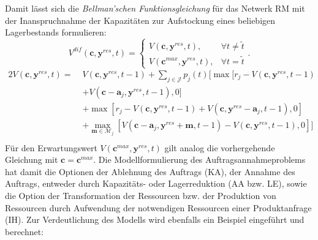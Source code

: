 Damit lässt sich die \textit{Bellman'schen Funktionsgleichung} für das Netwerk RM mit der Inanspruchnahme der Kapazitäten zur Aufstockung eines beliebigen Lagerbestands formulieren:
\begin{equation}\label{dif}
     V^{dif}(\textbf{c}, \textbf{y}^{res}, t)=\left\{\begin{array}{ll} V(\textbf{c}, \textbf{y}^{res}, t), & \forall t\neq\tilde{t}\\
         V(\textbf{c}^{max}, \textbf{y}^{res}, t), &\forall t=\tilde{t}\end{array}\right. .
\end{equation}
\begin{alignat*}{2}
 V(\textbf{c}, \textbf{y}^{res}, t) = \;& V(\textbf{c}, \textbf{y}^{res}, t-1)+ \sum_{j \in \mathcal{J}}p_{j}(t)[\max[r_{j} - V(\textbf{c}, \textbf{y}^{res}, t-1)\\
&+ V(\textbf{c}-\textbf{a}_j, \textbf{y}^{res}, t-1),0] \\
&+ \max[r_{j} - V(\textbf{c}, \textbf{y}^{res}, t-1) + V(\textbf{c}, \textbf{y}^{res}-\textbf{a}_j, t-1),0]\\
&+ \max_{\textbf{m}\in\mathcal{M}_{j}}[V(\textbf{c}-\textbf{a}_j, \textbf{y}^{res}+\textbf{m}, t-1) - V(\textbf{c}, \textbf{y}^{res}, t-1) ,0]]\\
\end{alignat*}
Für den Erwartungswert $V(\textbf{c}^{max}, \textbf{y}^{res}, t)$ gilt analog die vorhergehende Gleichung mit $\textbf{c}=\textbf{c}^{max}$. Die Modellformulierung des Auftragsannahmeproblems hat damit die Optionen der Ablehnung des Auftrags (KA), der Annahme des Auftrags, entweder durch Kapazitäts- oder Lagerreduktion (AA bzw. LE), sowie die Option der Transformation der Ressourcen bzw. der Produktion von Ressourcen durch Aufwendung der notwendigen Ressourcen einer Produktanfrage (IH). Zur Verdeutlichung des Modells wird ebenfalls ein Beispiel eingeführt und berechnet:

